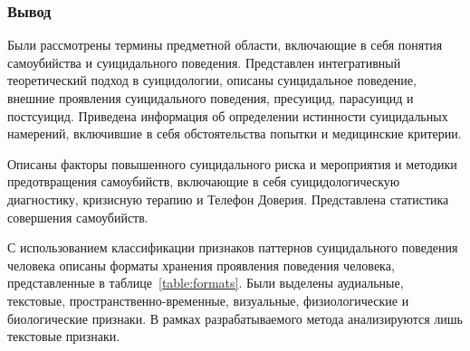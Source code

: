 \subsubsection*{Вывод}

Были рассмотрены термины предметной области, включающие в себя понятия самоубийства и суицидального поведения. 
Представлен интегративный теоретический подход в суицидологии, описаны суицидальное поведение, внешние проявления суицидального поведения, пресуицид, парасуицид и постсуицид. 
Приведена информация об определении истинности суицидальных намерений, включившие в себя обстоятельства попытки и медицинские критерии. 

Описаны факторы повышенного суицидального риска и мероприятия и методики предотвращения самоубийств, включающие в себя суицидологическую диагностику, кризисную терапию и Телефон Доверия.
Представлена статистика совершения самоубийств.


С использованием классификации признаков паттернов суицидального поведения человека описаны форматы хранения проявления поведения человека, представленные в таблице~\ref{table:formats}. 
Были выделены аудиальные, текстовые, пространственно-временные, визуальные, физиологические и биологические признаки.
В рамках разрабатываемого метода анализируются лишь текстовые признаки.

